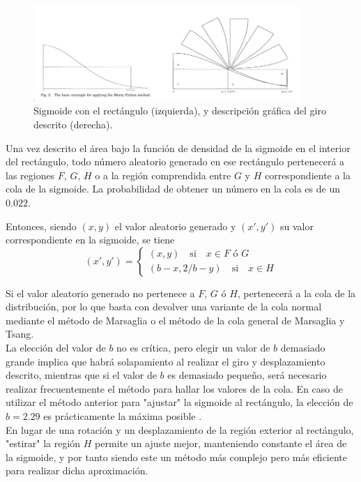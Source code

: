 \documentclass[a4paper,12pt]{article}
\begin{document}
	\begin{figure}[H]
		\centering
		\includegraphics[width=0.9\textwidth]{include/rotating_sigmoid.png}
		\caption{Sigmoide con el rectángulo (izquierda), y descripción gráfica del giro descrito (derecha).}
	\end{figure}
	
	Una vez descrito el área bajo la función de densidad de la sigmoide en el interior del rectángulo, todo número aleatorio generado en ese rectángulo pertenecerá a las regiones $F$, $G$, $H$ o a la región comprendida entre $G$ y $H$ correspondiente a la cola de la sigmoide. La probabilidad de obtener un número en la cola es de un $0.022$.
	
	Entonces, siendo $(x,y)$ el valor aleatorio generado y $(x',y')$ su valor correspondiente en la sigmoide, se tiene
	$$
	(x',y') = 
	\begin{cases}
		(x,y) \quad \text{si} \quad x\in F \text{ ó } G \\
		(b-x,2/b-y) \quad \text{si} \quad x \in H
	\end{cases}
	$$  
	
	Si el valor aleatorio generado no pertenece a $F$, $G$ ó $H$, pertenecerá a la cola de la distribución, por lo que basta con devolver una variante de la cola normal mediante el método de Marsaglia o el método de la cola general de Marsaglia y Tsang.\\
		
	La elección del valor de $b$ no es crítica, pero elegir un valor de $b$ demasiado grande implica que habrá solapamiento al realizar el giro y desplazamiento descrito, mientras que si el valor de $b$ es demasiado pequeño, será necesario realizar frecuentemente el método para hallar los valores de la cola.
	En caso de utilizar el método anterior para "ajustar" la sigmoide al rectángulo, la elección de $b=2.29$ es prácticamente la máxima posible \cite{segundo-articulo}. \\
		
	En lugar de una rotación y un desplazamiento de la región exterior al rectángulo, "estirar" la región $H$ permite un ajuste mejor, manteniendo constante el área de la sigmoide, y por tanto siendo este un método más complejo pero más eficiente para realizar dicha aproximación. 
	
\end{document}
